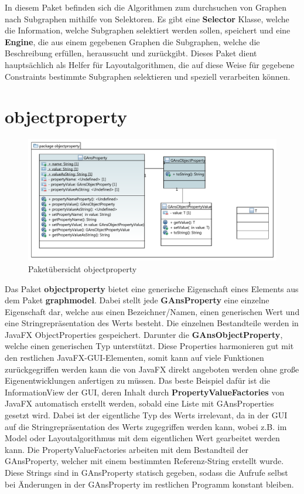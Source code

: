 In diesem Paket befinden sich die Algorithmen zum durchsuchen von Graphen nach Subgraphen mithilfe von Selektoren. Es gibt eine \textbf{Selector} Klasse, welche die Information, welche Subgraphen selektiert werden sollen, speichert und eine \textbf{Engine}, die aus einem gegebenen Graphen die Subgraphen, welche die Beschreibung erfüllen, heraussucht und zurückgibt. Dieses Paket dient hauptsächlich als Helfer für Layoutalgorithmen, die auf diese Weise für gegebene Constraints bestimmte Subgraphen selektieren und speziell verarbeiten können.

\newpage

\section{objectproperty}

\begin{figure}[hb]
  \centering
  \includegraphics[width=380pt]{resourcen/objectproperty.pdf}
  \caption{Paketübersicht objectproperty}
  \label{fig:packge_objectproperty}
\end{figure}

Das Paket \textbf{objectproperty} bietet eine generische Eigenschaft eines Elements aus dem Paket \textbf{graphmodel}. Dabei stellt jede \textbf{GAnsProperty} eine einzelne Eigenschaft dar, welche aus einen Bezeichner/Namen, einen generischen Wert und eine Stringrepräsentation des Werts besteht. Die einzelnen Bestandteile werden in JavaFX ObjectProperties gespeichert. Darunter die \textbf{GAnsObjectProperty}, welche einen generischen Typ unterstützt. Diese Properties harmonieren gut mit den restlichen JavaFX-GUI-Elementen, somit kann auf viele Funktionen zurückgegriffen werden kann die von JavaFX direkt angeboten werden ohne große Eigenentwicklungen anfertigen zu müssen. Das beste Beispiel dafür ist die InformationView der GUI, deren Inhalt durch \textbf{PropertyValueFactories} von JavaFX automatisch erstellt werden, sobald eine Liste mit GAnsProperties gesetzt wird. Dabei ist der eigentliche Typ des Werts irrelevant, da in der GUI auf die Stringrepräsentation des Werts zugegriffen werden kann, wobei z.B. im Model oder Layoutalgorithmus mit dem eigentlichen Wert gearbeitet werden kann. Die PropertyValueFactories arbeiten mit dem Bestandteil der GAnsProperty, welcher mit einem bestimmten Referenz-String erstellt wurde. Diese Strings sind in GAnsProperty statisch gegeben, sodass die Aufrufe selbst bei Änderungen in der GAnsProperty im restlichen Programm konstant bleiben.

